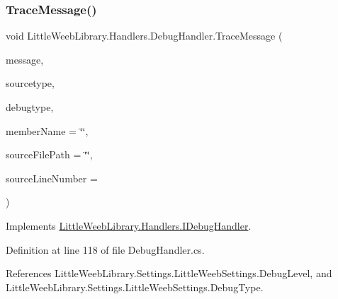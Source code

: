 \subsubsection{\texorpdfstring{Trace\+Message()}{TraceMessage()}}
{\footnotesize\ttfamily void Little\+Weeb\+Library.\+Handlers.\+Debug\+Handler.\+Trace\+Message (\begin{DoxyParamCaption}\item[{string}]{message,  }\item[{\mbox{\hyperlink{namespace_little_weeb_library_1_1_handlers_a2a6ca0775121c9c503d58aa254d292be}{Debug\+Source}}}]{sourcetype,  }\item[{\mbox{\hyperlink{namespace_little_weeb_library_1_1_handlers_ab66019ed40462876ec4e61bb3ccb0a62}{Debug\+Type}}}]{debugtype,  }\item[{\mbox{[}\+System.\+Runtime.\+Compiler\+Services.\+Caller\+Member\+Name\mbox{]} string}]{member\+Name = {\ttfamily \char`\"{}\char`\"{}},  }\item[{\mbox{[}\+System.\+Runtime.\+Compiler\+Services.\+Caller\+File\+Path\mbox{]} string}]{source\+File\+Path = {\ttfamily \char`\"{}\char`\"{}},  }\item[{\mbox{[}\+System.\+Runtime.\+Compiler\+Services.\+Caller\+Line\+Number\mbox{]} int}]{source\+Line\+Number = {} }\end{DoxyParamCaption})}



Implements \mbox{\hyperlink{interface_little_weeb_library_1_1_handlers_1_1_i_debug_handler_a2e405bc3492e683cd3702fae125221bc}{Little\+Weeb\+Library.\+Handlers.\+I\+Debug\+Handler}}.



Definition at line 118 of file Debug\+Handler.\+cs.



References Little\+Weeb\+Library.\+Settings.\+Little\+Weeb\+Settings.\+Debug\+Level, and Little\+Weeb\+Library.\+Settings.\+Little\+Weeb\+Settings.\+Debug\+Type.



